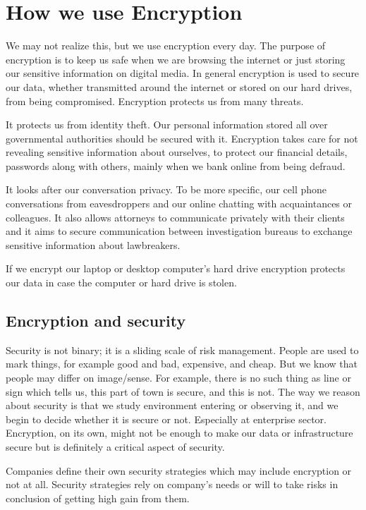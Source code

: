 \chapter{How we use Encryption}\label{encryption}

We may not realize this, but we use encryption every day.
The purpose of encryption is to keep us safe when we are browsing the internet or just storing our sensitive information on digital media.
In general encryption is used to secure our data, whether transmitted around the internet or stored on our hard drives, from being compromised.
Encryption protects us from many threats.

It protects us from identity theft.
Our personal information stored all over governmental authorities should be secured with it.
Encryption takes care for not revealing sensitive information about ourselves, to protect our financial details, passwords along with others, mainly when we bank online from being defraud.

It looks after our conversation privacy.
To be more specific, our cell phone conversations from eavesdroppers and our online chatting with acquaintances or colleagues.
It also allows attorneys to communicate privately with their clients and it aims to secure communication between investigation bureaus to exchange sensitive information about lawbreakers.

If we encrypt our laptop or desktop computer's hard drive encryption protects our data in case the computer or hard drive is stolen.

\section{Encryption and security}

Security is not binary; it is a sliding scale of risk management.
People are used to mark things, for example good and bad, expensive, and cheap.
But we know that people may differ on image/sense.
For example, there is no such thing as line or sign which tells us, this part of town is secure, and this is not.
The way we reason about security is that we study environment entering or observing it, and we begin to decide whether it is secure or not.
Especially at enterprise sector.
Encryption, on its own, might not be enough to make our data or infrastructure secure but is definitely a critical aspect of security.

Companies define their own security strategies which may include encryption or not at all.
Security strategies rely on company's needs or will to take risks in conclusion of getting high gain from them.

